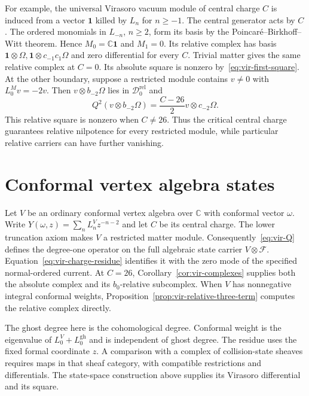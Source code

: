 For example, the universal Virasoro vacuum module of central charge $C$ is induced from a vector $\mathbf1$ killed by $L_n$ for $n\geq-1$.
The central generator acts by $C$.
The ordered monomials in $L_{-n}$, $n\geq2$, form its basis by the Poincar\'e--Birkhoff--Witt theorem.
Hence $M_0=\mathbb C\mathbf1$ and $M_1=0$.
Its relative complex has basis $\mathbf1\otimes\Omega,\mathbf1\otimes c_{-1}c_1\Omega$ and zero differential for every $C$.
Trivial matter gives the same relative complex at $C=0$.
Its absolute square is nonzero by~\eqref{eq:vir-first-square}.
At the other boundary, suppose a restricted module contains $v\neq0$ with $L_0^Mv=-2v$.
Then $v\otimes b_{-2}\Omega$ lies in $\mathcal D_0^{\mathrm{rel}}$ and
\[
 Q^2(v\otimes b_{-2}\Omega)=\frac{C-26}{2}v\otimes c_{-2}\Omega.
\]
This relative square is nonzero when $C\neq26$.
Thus the critical central charge guarantees relative nilpotence for every restricted module, while particular relative carriers can have further vanishing.

\section{Conformal vertex algebra states}

Let $V$ be an ordinary conformal vertex algebra over $\mathbb C$ with conformal vector $\omega$.
Write
$Y(\omega,z)=\sum_nL_n^Vz^{-n-2}$ and let $C$ be its central charge.
The lower truncation axiom makes $V$ a restricted matter module.
Consequently~\eqref{eq:vir-Q} defines the degree-one operator on the full algebraic state carrier $V\otimes\mathcal F$.
Equation~\eqref{eq:vir-charge-residue} identifies it with the zero mode of the specified normal-ordered current.
At $C=26$, Corollary~\ref{cor:vir-complexes} supplies both the absolute complex and its $b_0$-relative subcomplex.
When $V$ has nonnegative integral conformal weights, Proposition~\ref{prop:vir-relative-three-term} computes the relative complex directly.

The ghost degree here is the cohomological degree.
Conformal weight is the eigenvalue of $L_0^V+L_0^{\mathrm{gh}}$ and is independent of ghost degree.
The residue uses the fixed formal coordinate $z$.
A comparison with a complex of collision-state sheaves requires maps in that sheaf category, with compatible restrictions and differentials.
The state-space construction above supplies its Virasoro differential and its square.
